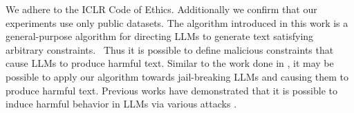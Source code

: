 We adhere to the ICLR Code of Ethics. Additionally we confirm that our experiments use only public datasets.
The algorithm introduced in this work is a general-purpose algorithm for directing LLMs to generate text satisfying arbitrary constraints. \
Thus it is possible to define malicious constraints that cause LLMs to produce harmful text. 
Similar to the work done in \citep{guo2024cold}, it may be possible to apply our algorithm towards jail-breaking LLMs and causing them to produce harmful text. 
Previous works have demonstrated that it is possible to induce harmful behavior in LLMs via various attacks \citep{he2024talk, liu2023prompt, schwinn2023adversarial}. 